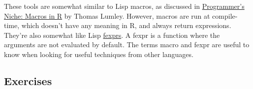 \begin{Shaded}
\begin{Highlighting}[]
\NormalTok{(} 
  \StringTok{  }
\StringTok{    }
\NormalTok{\}))}
\CommentTok{#> \}}
\end{Highlighting}
\end{Shaded}

These tools are somewhat similar to Lisp macros, as discussed in
\href{http://www.r-project.org/doc/Rnews/Rnews_2001-3.pdf\#page=10}{Programmer's
Niche: Macros in R} by Thomas Lumley. However, macros are run at
compile-time, which doesn't have any meaning in R, and always return
expressions. They're also somewhat like Lisp
\href{http://en.wikipedia.org/wiki/Fexpr}{fexprs}. A fexpr is a function
where the arguments are not evaluated by default. The terms macro and
fexpr are useful to know when looking for useful techniques from other
languages.  

\subsection{Exercises}


